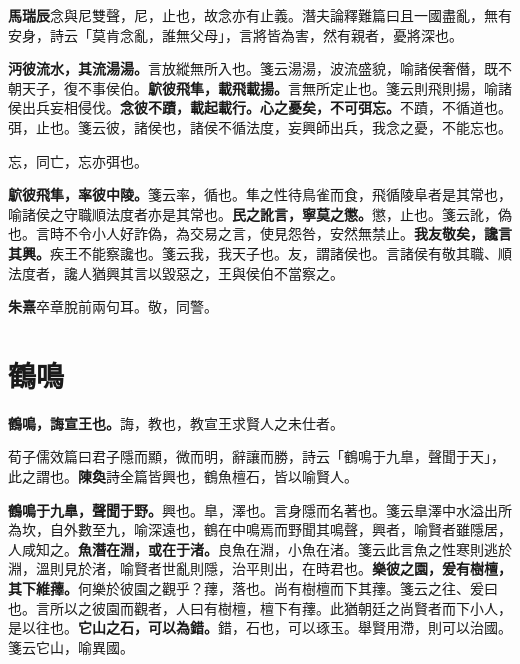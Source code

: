 \begin{quoting}\textbf{馬瑞辰}念與尼雙聲，尼，止也，故念亦有止義。潛夫論釋難篇曰且一國盡亂，無有安身，詩云「莫肯念亂，誰無父母」，言將皆為害，然有親者，憂將深也。\end{quoting}

\textbf{沔彼流水，其流湯湯。}{\footnotesize 言放縱無所入也。箋云湯湯，波流盛貌，喻諸侯奢僭，既不朝天子，復不事侯伯。}\textbf{鴥彼飛隼，載飛載揚。}{\footnotesize 言無所定止也。箋云則飛則揚，喻諸侯出兵妄相侵伐。}\textbf{念彼不蹟，載起載行。心之憂矣，不可弭忘。}{\footnotesize 不蹟，不循道也。弭，止也。箋云彼，諸侯也，諸侯不循法度，妄興師出兵，我念之憂，不能忘也。}

\begin{quoting}忘，同亡，忘亦弭也。\end{quoting}

\textbf{鴥彼飛隼，率彼中陵。}{\footnotesize 箋云率，循也。隼之性待鳥雀而食，飛循陵阜者是其常也，喻諸侯之守職順法度者亦是其常也。}\textbf{民之訛言，寧莫之懲。}{\footnotesize 懲，止也。箋云訛，偽也。言時不令小人好詐偽，為交易之言，使見怨咎，安然無禁止。}\textbf{我友敬矣，讒言其興。}{\footnotesize 疾王不能察讒也。箋云我，我天子也。友，謂諸侯也。言諸侯有敬其職、順法度者，讒人猶興其言以毀惡之，王與侯伯不當察之。}

\begin{quoting}\textbf{朱熹}卒章脫前兩句耳。敬，同警。\end{quoting}

\section{鶴鳴}


\textbf{鶴鳴，誨宣王也。}{\footnotesize 誨，教也，教宣王求賢人之未仕者。}

\begin{quoting}荀子儒效篇曰君子隱而顯，微而明，辭讓而勝，詩云「鶴鳴于九臯，聲聞于天」，此之謂也。\textbf{陳奐}詩全篇皆興也，鶴魚檀石，皆以喻賢人。\end{quoting}

\textbf{鶴鳴于九臯，聲聞于野。}{\footnotesize 興也。臯，澤也。言身隱而名著也。箋云臯澤中水溢出所為坎，自外數至九，喻深遠也，鶴在中鳴焉而野聞其鳴聲，興者，喻賢者雖隱居，人咸知之。}\textbf{魚潛在淵，或在于渚。}{\footnotesize 良魚在淵，小魚在渚。箋云此言魚之性寒則逃於淵，溫則見於渚，喻賢者世亂則隱，治平則出，在時君也。}\textbf{樂彼之園，爰有樹檀，其下維蘀。}{\footnotesize 何樂於彼園之觀乎？蘀，落也。尚有樹檀而下其蘀。箋云之往、爰曰也。言所以之彼園而觀者，人曰有樹檀，檀下有蘀。此猶朝廷之尚賢者而下小人，是以往也。}\textbf{它山之石，可以為錯。}{\footnotesize 錯，石也，可以琢玉。舉賢用滯，則可以治國。箋云它山，喻異國。}

